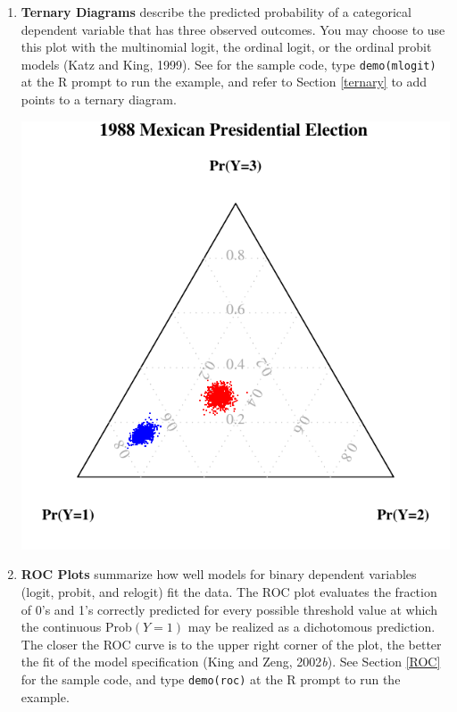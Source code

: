 \documentclass{article}
\begin{document}
\begin{enumerate}
  
\item {\bf Ternary Diagrams} describe the predicted probability of a
  categorical dependent variable that has three observed outcomes.
  You may choose to use this plot with the multinomial logit, the
  ordinal logit, or the ordinal probit models (Katz and King,
  1999).\nocite{KatKin99} See  for the sample code, type
  {\tt demo(mlogit)} at the R prompt to run the example, and refer to
  Section \ref{ternary} to add points to a ternary diagram.
  
\begin{center}
\includegraphics{figs/ternary}
\end{center}

\newpage

\item {\bf ROC Plots} summarize how well models for binary dependent
  variables (logit, probit, and relogit) fit the data.  The ROC plot
  evaluates the fraction of 0's and 1's correctly predicted for every
  possible threshold value at which the continuous Prob$(Y = 1)$ may
  be realized as a dichotomous prediction.  The closer the ROC curve
  is to the upper right corner of the plot, the better the fit of the
  model specification (King and Zeng, 2002\emph{b})\nocite{KinZen02}.
  See Section \ref{ROC} for the sample code, and type {\tt demo(roc)} at the
  R prompt to run the example.


\end{enumerate}
\end{document}
